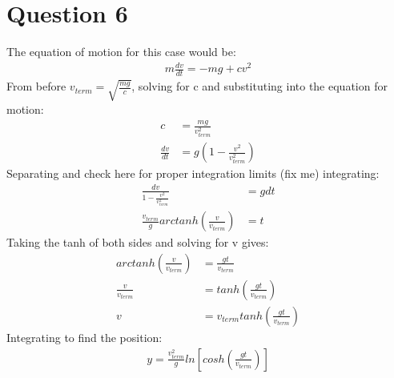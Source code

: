 \documentclass[a4paper,12pt]{article}
\begin{document}
\section*{Question 6}
The equation of motion for this case would be:
\begin{align*}
m\frac{dv}{dt}=-mg+cv^2
\end{align*}
From before $v_{term}=\sqrt{\frac{mg}{c}}$, solving for c and
substituting into the equation for motion:
\begin{align*}
c&=\frac{mg}{v_{term}^2}\\
\frac{dv}{dt}&=g\left(1-\frac{v^2}{v_{term}^2}\right)
\end{align*}
Separating and check here for proper integration limits (fix me) integrating:
\begin{align*}
\frac{dv}{1-\frac{v^2}{v_{term}^2}}&=gdt\\
\frac{v_{term}}{g}arctanh\left(\frac{v}{v_{term}}\right)&=t
\end{align*}
Taking the tanh of both sides and solving for v gives:
\begin{align*}
arctanh\left(\frac{v}{v_{term}}\right)&=\frac{gt}{v_{term}}\\
\frac{v}{v_{term}}&=tanh\left(\frac{gt}{v_{term}}\right)\\
v&=v_{term}tanh\left(\frac{gt}{v_{term}}\right)
\end{align*}
Integrating to find the position:
\begin{align*}
y=\frac{v_{term}^2}{g}ln\left[cosh\left(\frac{gt}{v_{term}}\right)\right]
\end{align*}
\end{document}

